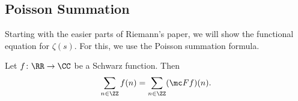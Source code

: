 \documentclass[../notes.tex]{subfiles}
\begin{document}
\subsection{Poisson Summation}
Starting with the easier parts of Riemann's paper, we will show the functional equation for $\zeta(s)$. For this, we use the Poisson summation formula.
\begin{theorem} \label{thm:ps}
	Let $f\colon\RR\to\CC$ be a Schwarz function. Then
	\[\sum_{n\in\ZZ}f(n)=\sum_{n\in\ZZ}(\mc Ff)(n).\]
\end{theorem}
\end{document}
